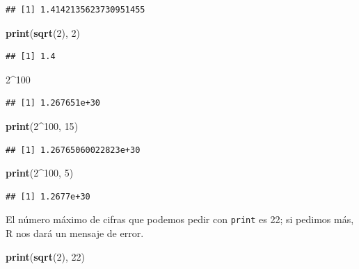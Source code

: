 \documentclass[]{book}
\newenvironment{Shaded}{\begin{snugshade}}{\end{snugshade}}
\newcommand{\DecValTok}[1]{\textcolor[rgb]{0.00,0.00,0.81}{#1}}
\newcommand{\KeywordTok}[1]{\textcolor[rgb]{0.13,0.29,0.53}{\textbf{#1}}}
\newcommand{\NormalTok}[1]{#1}
\newcommand{\OperatorTok}[1]{\textcolor[rgb]{0.81,0.36,0.00}{\textbf{#1}}}
\theoremstyle{definition}
\theoremstyle{definition}
\theoremstyle{definition}
\theoremstyle{remark}
\begin{document}
\begin{verbatim}
## [1] 1.4142135623730951455
\end{verbatim}

\begin{Shaded}
\begin{Highlighting}[]
\KeywordTok{print}\NormalTok{(}\KeywordTok{sqrt}\NormalTok{(}\DecValTok{2}\NormalTok{), }\DecValTok{2}\NormalTok{)}
\end{Highlighting}
\end{Shaded}

\begin{verbatim}
## [1] 1.4
\end{verbatim}

\begin{Shaded}
\begin{Highlighting}[]
\DecValTok{2}\OperatorTok{^}\DecValTok{100}
\end{Highlighting}
\end{Shaded}

\begin{verbatim}
## [1] 1.267651e+30
\end{verbatim}

\begin{Shaded}
\begin{Highlighting}[]
\KeywordTok{print}\NormalTok{(}\DecValTok{2}\OperatorTok{^}\DecValTok{100}\NormalTok{, }\DecValTok{15}\NormalTok{)}
\end{Highlighting}
\end{Shaded}

\begin{verbatim}
## [1] 1.26765060022823e+30
\end{verbatim}

\begin{Shaded}
\begin{Highlighting}[]
\KeywordTok{print}\NormalTok{(}\DecValTok{2}\OperatorTok{^}\DecValTok{100}\NormalTok{, }\DecValTok{5}\NormalTok{)}
\end{Highlighting}
\end{Shaded}

\begin{verbatim}
## [1] 1.2677e+30
\end{verbatim}

El número máximo de cifras que podemos pedir con \texttt{print} es 22; si pedimos más, R nos dará un mensaje de error.

\begin{Shaded}
\begin{Highlighting}[]
\KeywordTok{print}\NormalTok{(}\KeywordTok{sqrt}\NormalTok{(}\DecValTok{2}\NormalTok{), }\DecValTok{22}\NormalTok{)}
\end{Highlighting}
\end{Shaded}
\end{document}
